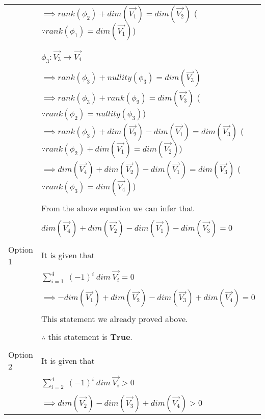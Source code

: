 \documentclass[journal,12pt]{IEEEtran}
\begin{document}
\begin{longtable}{|l|l|}
		& $\implies rank(\phi_2) + dim(\vec{V_1}) = dim(\vec{V_2})$ \qquad \qquad ($\because  rank(\phi_1) = dim(\vec{V_1})$) \\
		& \\
		& \\
		& $\phi_3 : \vec{V_3} \rightarrow \vec{V_4}$ \\
		& \\
		& $\implies rank(\phi_3) + nullity(\phi_3) = dim(\vec{V_3})$ \\
		& $\implies rank(\phi_3) + rank(\phi_2) = dim(\vec{V_3})$ \qquad \qquad ($\because  rank(\phi_2) = nullity(\phi_3)$) \\
		& $\implies rank(\phi_3) + dim(\vec{V_2}) - dim(\vec{V_1}) = dim(\vec{V_3})$     ($\because  rank(\phi_2) + dim(\vec{V_1}) = dim(\vec{V_2})$) \\
		& $\implies dim(\vec{V_4}) + dim(\vec{V_2}) - dim(\vec{V_1}) = dim(\vec{V_3})$ \qquad ($\because  rank(\phi_3) = dim(\vec{V_4})$) \\
		& \\
		& From the above equation we can infer that \\
		& \\
		& \qquad \qquad $dim(\vec{V_4}) + dim(\vec{V_2}) - dim(\vec{V_1}) - dim(\vec{V_3}) = 0$ \\
		& \\
		\hline
		\multirow{3}{*}{Option 1  } & \\
		& It is given that \\
		& \\
		& $\sum_{i=1}^{4} \ (-1)^{i} \ dim \ \vec{V_i} = 0$ \\
		& \\
		& $\implies - dim(\vec{V_1}) + dim(\vec{V_2}) - dim(\vec{V_3}) + dim(\vec{V_4}) = 0$ \\
		& \\
		& This statement we already proved above. \\
		& \\
		& $\therefore$ this statement is $\mathbf{True}$. \\
		&\\
		\hline
		\multirow{3}{*}{Option 2} & \\
		& It is given that \\
		& \\
		& $\sum_{i=2}^{4} \ (-1)^{i} \ dim \ \vec{V_i} > 0$ \\
		& \\
		& $\implies dim(\vec{V_2}) - dim(\vec{V_3}) + dim(\vec{V_4}) > 0$ \\

\end{longtable}
\end{document}
